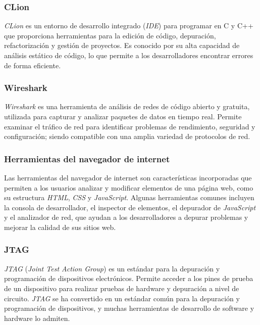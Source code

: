 \subsubsection{CLion}

\textit{CLion} \citep{clion} es un entorno de desarrollo integrado (\textit{IDE}) para programar en C y C++ que proporciona herramientas para la edición de código, depuración, refactorización y gestión de proyectos. Es conocido por su alta capacidad de análisis estático de código, lo que permite a los desarrolladores encontrar errores de forma eficiente.


\subsubsection{Wireshark}

\textit{Wireshark} \citep{wireshark} es una herramienta de análisis de redes de código abierto y gratuita, utilizada para capturar y analizar paquetes de datos en tiempo real. Permite examinar el tráfico de red para identificar problemas de rendimiento, seguridad y configuración; siendo compatible con una amplia variedad de protocolos de red.


\subsubsection{Herramientas del navegador de internet}

Las herramientas del navegador de internet son características incorporadas que permiten a los usuarios analizar y modificar elementos de una página web, como su estructura \textit{HTML}, \textit{CSS} y \textit{JavaScript}. Algunas herramientas comunes incluyen la consola de desarrollador, el inspector de elementos, el depurador de \textit{JavaScript} y el analizador de red, que ayudan a los desarrolladores a depurar problemas y mejorar la calidad de sus sitios web.


\subsubsection{JTAG}

\textit{JTAG} (\textit{Joint Test Action Group}) \citep{jtag} es un estándar para la depuración y programación de dispositivos electrónicos. Permite acceder a los pines de prueba de un dispositivo para realizar pruebas de hardware y depuración a nivel de circuito. \textit{JTAG} se ha convertido en un estándar común para la depuración y programación de dispositivos, y muchas herramientas de desarrollo de software y hardware lo admiten.


